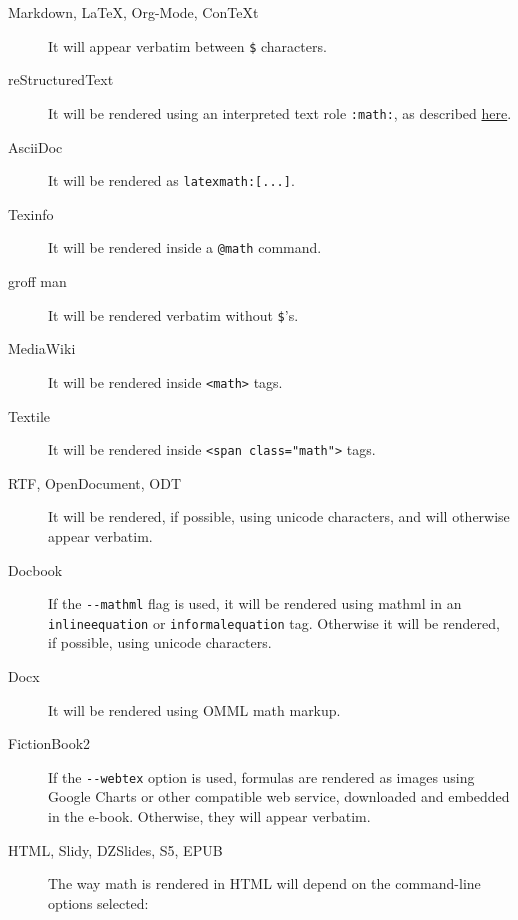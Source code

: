 \documentclass[]{article}
\begin{document}
\begin{description}
\item[Markdown, LaTeX, Org-Mode, ConTeXt]
It will appear verbatim between \texttt{\$} characters.
\item[reStructuredText]
It will be rendered using an interpreted text role \texttt{:math:}, as
described
\href{http://www.american.edu/econ/itex2mml/mathhack.rst}{here}.
\item[AsciiDoc]
It will be rendered as \texttt{latexmath:{[}...{]}}.
\item[Texinfo]
It will be rendered inside a \texttt{@math} command.
\item[groff man]
It will be rendered verbatim without \texttt{\$}'s.
\item[MediaWiki]
It will be rendered inside \texttt{\textless{}math\textgreater{}} tags.
\item[Textile]
It will be rendered inside
\texttt{\textless{}span class="math"\textgreater{}} tags.
\item[RTF, OpenDocument, ODT]
It will be rendered, if possible, using unicode characters, and will
otherwise appear verbatim.
\item[Docbook]
If the \texttt{-{}-mathml} flag is used, it will be rendered using
mathml in an \texttt{inlineequation} or \texttt{informalequation} tag.
Otherwise it will be rendered, if possible, using unicode characters.
\item[Docx]
It will be rendered using OMML math markup.
\item[FictionBook2]
If the \texttt{-{}-webtex} option is used, formulas are rendered as
images using Google Charts or other compatible web service, downloaded
and embedded in the e-book. Otherwise, they will appear verbatim.
\item[HTML, Slidy, DZSlides, S5, EPUB]
The way math is rendered in HTML will depend on the command-line options
selected:


\end{description}
\end{document}
